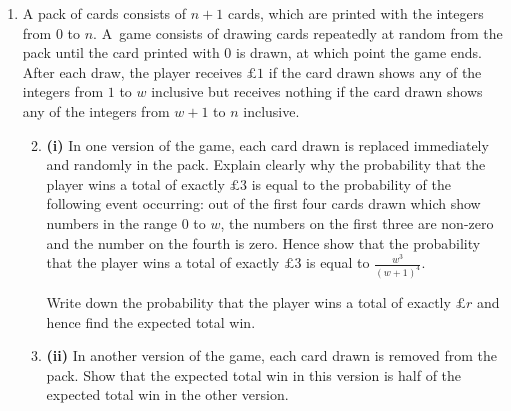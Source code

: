 \documentclass[a4, 11pt]{report}
\newlength{\qspace}
\newcounter{qnumber}
\newenvironment{question}%
 {\vspace{\qspace}
  \begin{enumerate}[\bfseries 1\quad][10]%
    \setcounter{enumi}{\value{qnumber}}%
    \item%
 }
{
  \end{enumerate}
  \filbreak
  \stepcounter{qnumber}
 }
\newenvironment{questionparts}[1][1]%
 {
  \begin{enumerate}[\bfseries (i)]%
    \setcounter{enumii}{#1}
    \addtocounter{enumii}{-1}
    \setlength{\itemsep}{5mm}
    \setlength{\parskip}{8pt}
 }
 {
  \end{enumerate}
 }
\newcommand{\ds}{\displaystyle}
\begin{document}
\begin{question}
A pack of cards consists of  $n+1$ cards, 
which are printed with the integers from 
$0$ to $n$.   A~game consists of drawing cards  repeatedly at 
random from the pack until the 
card printed with 0 is drawn, at which point  the game ends. 
After each draw, the player 
receives $\pounds 1$ if the card  drawn shows any of the 
integers from $1$ to $w$ inclusive but receives nothing 
if  the card  drawn shows any of the 
integers from $w+1$ to $n$ inclusive.

\begin{questionparts}
\item[\bf (i)]  In one version of the game, each card drawn is replaced immediately
and randomly in the pack.
Explain clearly why the probability that the player 
wins a total of exactly $\pounds 3$ 
is equal to the probability of the following event 
occurring:
out of the first four cards drawn which show 
 numbers in the range $0$ to $w$, 
the numbers on the first three are non-zero and the  
number on the fourth is zero.
Hence show that the probability that the player 
wins a total  of exactly  $\pounds 3$ is equal to $\ds \frac{w^3}{(w+1)^4}$. 
 
Write down the probability that the player wins a total of exactly 
$\pounds r$ and hence find the  expected total win.  
 
\item[\bf (ii)] In another version of the game,  
each card drawn is removed from the pack.
Show that the  expected total win in this version is 
half of the expected total win in the other version. 

\end{questionparts}
\end{question}
\end{document}

